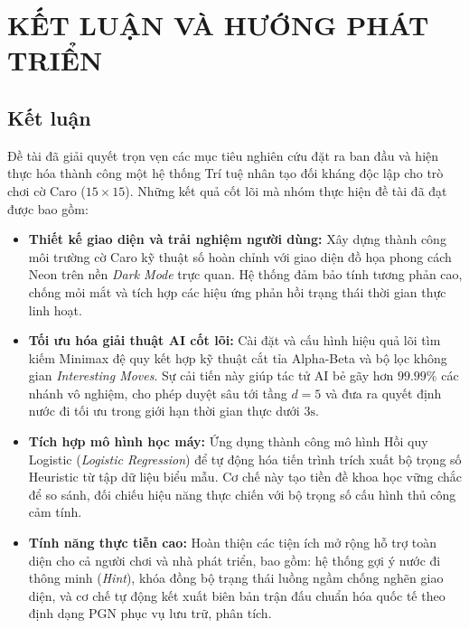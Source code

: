 
\chapter{KẾT LUẬN VÀ HƯỚNG PHÁT TRIỂN}
\label{Chapter5}

\section{Kết luận}

Đề tài đã giải quyết trọn vẹn các mục tiêu nghiên cứu đặt ra ban đầu và hiện thực hóa thành công một hệ thống Trí tuệ nhân tạo đối kháng độc lập cho trò chơi cờ Caro ($15 \times 15$). Những kết quả cốt lõi mà nhóm thực hiện đề tài đã đạt được bao gồm:

\begin{itemize}
	\item \textbf{Thiết kế giao diện và trải nghiệm người dùng:} Xây dựng thành công môi trường cờ Caro kỹ thuật số hoàn chỉnh với giao diện đồ họa phong cách Neon trên nền \textit{Dark Mode} trực quan. Hệ thống đảm bảo tính tương phản cao, chống mỏi mắt và tích hợp các hiệu ứng phản hồi trạng thái thời gian thực linh hoạt.
	
	\item \textbf{Tối ưu hóa giải thuật AI cốt lõi:} Cài đặt và cấu hình hiệu quả lõi tìm kiếm Minimax đệ quy kết hợp kỹ thuật cắt tỉa Alpha-Beta và bộ lọc không gian \textit{Interesting Moves}. Sự cải tiến này giúp tác tử AI bẻ gãy hơn $99.99\%$ các nhánh vô nghiệm, cho phép duyệt sâu tới tầng $d=5$ và đưa ra quyết định nước đi tối ưu trong giới hạn thời gian thực dưới $3\text{s}$.
	
	\item \textbf{Tích hợp mô hình học máy:} Ứng dụng thành công mô hình Hồi quy Logistic (\textit{Logistic Regression}) để tự động hóa tiến trình trích xuất bộ trọng số Heuristic từ tập dữ liệu biểu mẫu. Cơ chế này tạo tiền đề khoa học vững chắc để so sánh, đối chiếu hiệu năng thực chiến với bộ trọng số cấu hình thủ công cảm tính.
	
	\item \textbf{Tính năng thực tiễn cao:} Hoàn thiện các tiện ích mở rộng hỗ trợ toàn diện cho cả người chơi và nhà phát triển, bao gồm: hệ thống gợi ý nước đi thông minh (\textit{Hint}), khóa đồng bộ trạng thái luồng ngầm chống nghẽn giao diện, và cơ chế tự động kết xuất biên bản trận đấu chuẩn hóa quốc tế theo định dạng PGN phục vụ lưu trữ, phân tích.
\end{itemize}

